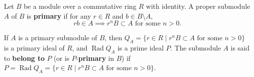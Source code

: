 Let $B$ be a module over a commutative ring $R$ with identity. A proper submodule $A$ of $B$ is \textbf{primary} if for any $r \in R$ and $b \in B \setminus A$,
\[
rb \in A \implies r^n B \subset A \text{ for some } n > 0.
\]

If $A$ is a primary submodule of $B$, then $Q_A = \{ r \in R \mid r^n B \subset A \text{ for some } n > 0 \}$ is a primary ideal of $R$, and $\operatorname{Rad} Q_A$ is a prime ideal $P$. The submodule $A$ is said to \textbf{belong to} $P$ (or is $P$-\textbf{primary} in $B$) if $P = \operatorname{Rad} Q_A = \{ r \in R \mid r^n B \subset A \text{ for some } n > 0 \}$.
